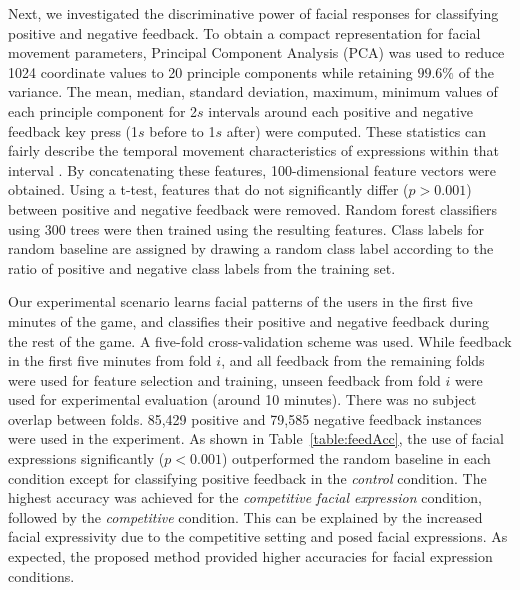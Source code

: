 \documentclass[10pt,journal,compsoc]{IEEEtran}
\begin{document}
Next, we investigated the discriminative power of facial
responses for classifying positive and negative feedback. To
obtain a compact representation for facial movement parameters,
Principal Component Analysis (PCA) was used to reduce 1024
coordinate values to 20 principle components while retaining
$99.6\%$ of the variance. The mean, median, standard deviation,
maximum, minimum values of each principle component for 2$s$
intervals around each positive and negative feedback key press
(1$s$ before to 1$s$ after) were computed. These statistics can fairly describe the temporal movement characteristics of expressions within that interval \cite{cohn2009detecting,dibeklioglu2015recognition,dibekliouglu2015multimodal}. By
concatenating these features, 100-dimensional feature vectors were
obtained. Using a t-test, features that do not significantly
differ ($p>0.001$) between positive and negative feedback were
removed. Random forest classifiers \cite{breiman2001random} %
using 300 trees were then trained using the resulting features.
Class labels for random baseline are assigned by drawing a random class label according to the ratio of positive and negative class labels from the training set.

Our experimental scenario learns facial patterns of the
users in the first five minutes of the game, and classifies their
positive and negative feedback during the rest of the game. A five-fold cross-validation scheme was used. While
feedback in the first five minutes from fold $i$, and all
feedback from the remaining folds were used for feature
selection and training, unseen feedback from fold $i$ were
used for experimental evaluation (around 10 minutes). There was no subject overlap between
folds. %
85,429 positive and 79,585
negative feedback instances were used in the experiment.
As shown in
Table~\ref{table:feedAcc}, the use of facial expressions
significantly ($p<0.001$) outperformed the random baseline in each
condition except for classifying positive feedback in the 
\emph{control} condition. The highest accuracy was achieved for the
\emph{competitive facial expression} condition, followed by the
\emph{competitive} condition. This can be explained by the
increased facial expressivity due to the competitive setting and posed facial expressions.  As
expected, the proposed method provided higher accuracies for
facial expression conditions.
\end{document}

